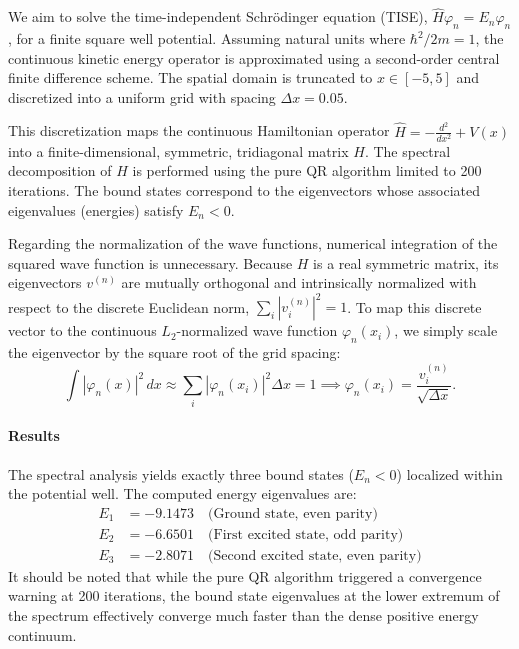 \begin{solution}

	We aim to solve the time-independent Schr\"odinger equation (TISE),
	$\hat{H}\varphi_n = E_n\varphi_n$, for a finite square well potential. Assuming
	natural units where $\hbar^2/2m = 1$, the continuous kinetic energy operator is
	approximated using a second-order central finite difference scheme. The spatial
	domain is truncated to $x \in [-5, 5]$ and discretized into a uniform grid with
	spacing $\Delta x = 0.05$. 

	This discretization maps the continuous Hamiltonian operator $\hat{H} =
	-\frac{d^2}{dx^2} + V(x)$ into a finite-dimensional, symmetric, tridiagonal
	matrix $H$. The spectral decomposition of $H$ is performed using the pure QR
	algorithm limited to 200 iterations. The bound states correspond to the
	eigenvectors whose associated eigenvalues (energies) satisfy $E_n < 0$.

	Regarding the normalization of the wave functions, numerical integration of
	the squared wave function is unnecessary. Because $H$ is a real symmetric
	matrix, its eigenvectors $v^{(n)}$ are mutually orthogonal and intrinsically
	normalized with respect to the discrete Euclidean norm, $\sum_i |v^{(n)}_i|^2 =
	1$. To map this discrete vector to the continuous $L_2$-normalized wave function
	$\varphi_n(x_i)$, we simply scale the eigenvector by the square root of the grid
	spacing:
	\[
		\int |\varphi_n(x)|^2 \, dx \approx \sum_i |\varphi_n(x_i)|^2 \Delta x = 1
		\implies \varphi_n(x_i) = \frac{v^{(n)}_i}{\sqrt{\Delta x}}.
	\]

	\paragraph{Results}
	The spectral analysis yields exactly three bound states ($E_n < 0$) localized
	within the potential well. The computed energy eigenvalues are:
	\begin{align*}
			E_1 &= -9.1473 \quad \text{(Ground state, even parity)}\\
			E_2 &= -6.6501 \quad \text{(First excited state, odd parity)}\\
			E_3 &= -2.8071 \quad \text{(Second excited state, even parity)}
	\end{align*}
	It should be noted that while the pure QR algorithm triggered a convergence
	warning at 200 iterations, the bound state eigenvalues at the lower extremum of
	the spectrum effectively converge much faster than the dense positive energy
	continuum.


\end{solution}
